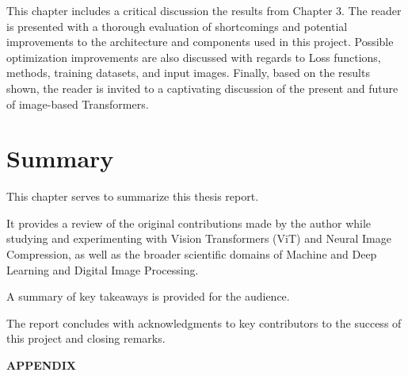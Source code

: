 \documentclass[pdftex,11pt,titlepage,twoside,openright]{report}
\begin{document}
This chapter includes a critical discussion the results from Chapter 3.
The reader is presented with a thorough evaluation of shortcomings and potential improvements to
the architecture and components used in this project.
Possible optimization improvements are also discussed with regards to Loss functions, methods, training 
datasets, and input images.
Finally, based on the results shown, the reader is invited to a captivating discussion of the
present and future of image-based Transformers.

\ThinHRule

\newpage


\chapter{Summary}

This chapter serves to summarize this thesis report. 

It provides a review of the original contributions made by the author while studying and experimenting 
with Vision Transformers (ViT) and Neural Image Compression, as well as the broader 
scientific domains of Machine and Deep Learning and Digital Image Processing. 

A summary of key takeaways is provided for the audience.

The report concludes with acknowledgments to key contributors to the success of this project 
and closing remarks.


\ThinHRule

\newpage



{} %
\pagestyle{plain}






\newpage
{} %
\pagestyle{plain}
{\textbf{\LARGE{APPENDIX}}}\\	%

\end{document}

